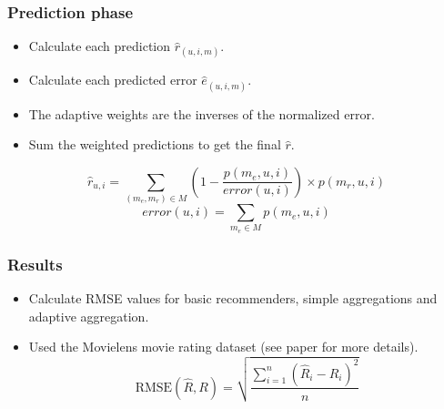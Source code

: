 \documentclass[screen]{beamer}
\begin{document}
\begin{frame}
  \frametitle{Prediction phase}
  
  \begin{itemize}
    \item Calculate each prediction $\hat{r}_{(u,i,m)}$.
    \item Calculate each predicted error $\hat{e}_{(u,i,m)}$.
    \item The adaptive weights are the inverses of the normalized error.
    \item Sum the weighted predictions to get the final $\hat{r}$.
  \end{itemize}  
\end{frame}

\begin{frame}
  \begin{equation}
    \label{eq:adaptive}
    \hat{r}_{u,i} = \sum_{(m_{e}, m_{r}) \in M} (1 - 
    \frac{
      p(m_{e},u,i)
    }{
      error(u,i)
    }) \times p(m_{r},u,i)
  \end{equation}
  \vspace{2em}
  \begin{equation}
    error(u,i) = \sum_{m_e \in M} p(m_e,u,i)     
  \end{equation}
\end{frame}

\begin{frame}
  \frametitle{Results}
  \begin{itemize}
    \item Calculate RMSE values for basic recommenders, simple aggregations and adaptive aggregation.
    \item Used the Movielens movie rating dataset (see paper for more details).
    \vspace{2em}
    \begin{equation}
      \mathrm{RMSE}(\hat{R},R)
      = \sqrt{\frac{
          \sum_{i=1}^{n} (\hat{R}_i - R_i)^2
        }{
          n
        }}
    \end{equation}
  \end{itemize}
\end{frame}

\begin{frame}
  
\end{frame}

\begin{frame}
  
\end{frame}

\begin{frame}
  
\end{frame}
\end{document}
